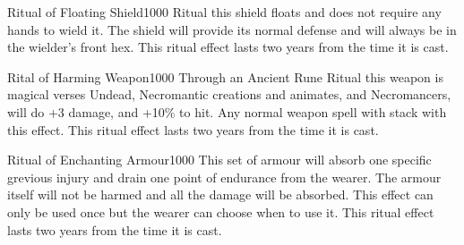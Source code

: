 \documentclass{article}
\begin{document}
\begin{item-box}{Ritual of Floating Shield}{1000}
Ritual this shield floats and does not require any hands to wield it.
The shield will provide its normal defense and will always be in the
wielder's front hex.  This ritual effect lasts two years from the time
it is cast.
\tcblower
\end{item-box}


\begin{item-box}{Rital of Harming Weapon}{1000}
Through an Ancient Rune Ritual this weapon is magical verses Undead,
Necromantic creations and animates, and Necromancers, will do +3
damage, and +10\% to hit.  Any normal weapon spell with stack with
this effect.  This ritual effect lasts two years from the time it is
cast.
\tcblower
\end{item-box}

\begin{item-box}{Ritual of Enchanting Armour}{1000}
This set of armour will absorb one specific grevious injury and drain
one point of endurance from the wearer.  The armour itself will not be
harmed and all the damage will be absorbed.  This effect can only be
used once but the wearer can choose when to use it.  This ritual
effect lasts two years from the time it is cast.
\tcblower
\end{item-box}
\end{document}
